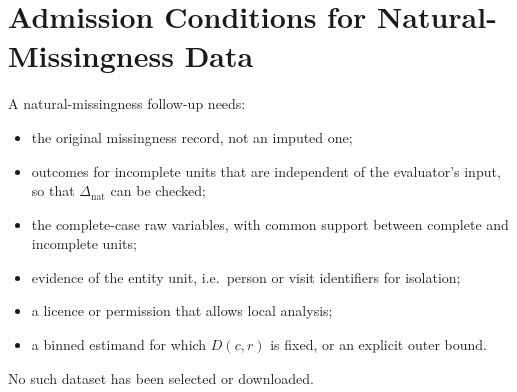 \documentclass{article}
\theoremstyle{plain}
\theoremstyle{definition}
\theoremstyle{remark}
\newcommand{\Dnat}{\Delta_{\mathrm{nat}}}
\begin{document}
\section{Admission Conditions for Natural-Missingness Data}
\label{app:admission}
A natural-missingness follow-up needs:
\begin{itemize}
\item the original missingness record, not an imputed one;
\item outcomes for incomplete units that are independent of the
evaluator's input, so that $\Dnat$ can be checked;
\item the complete-case raw variables, with common support between complete
and incomplete units;
\item evidence of the entity unit, i.e.\ person or visit identifiers for
isolation;
\item a licence or permission that allows local analysis;
\item a binned estimand for which $D(c,r)$ is fixed, or an explicit outer bound.
\end{itemize}
No such dataset has been selected or downloaded.
\end{document}
